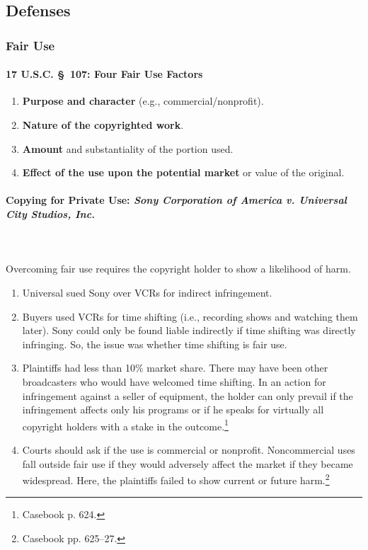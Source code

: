 \subsection{Defenses}

\subsubsection{Fair Use}

\paragraph{17 U.S.C. \S\ 107: Four Fair Use Factors}

\begin{enumerate}
    \item \textbf{Purpose and character} (e.g., commercial/nonprofit).
    \item \textbf{Nature of the copyrighted work}.
    \item \textbf{Amount} and substantiality of the portion used.
    \item \textbf{Effect of the use upon the potential market} or value of the 
    original.
\end{enumerate}

\paragraph{Copying for Private Use: \emph{Sony Corporation of America v. 
Universal City Studios, Inc.}}
~\\\\
Overcoming fair use requires the copyright holder to show a likelihood of 
harm.

\begin{enumerate}
    \item Universal sued Sony over VCRs for indirect infringement.
    \item Buyers used VCRs for time shifting (i.e., recording shows and 
    watching them later). Sony could only be found liable indirectly if time 
    shifting was directly infringing. So, the issue was whether time shifting 
    is fair use.
    \item Plaintiffs had less than 10\% market share. There may have been 
    other broadcasters who would have welcomed time shifting. In an action for 
    infringement against a seller of equipment, the holder can only prevail if 
    the infringement affects only his programs or if he speaks for virtually 
    all copyright holders with a stake in the outcome.\footnote{Casebook p. 
    624.}
    \item Courts should ask if the use is commercial or nonprofit. 
    Noncommercial uses fall outside fair use if they would adversely affect 
    the market if they became widespread. Here, the plaintiffs failed to show 
    current or future harm.\footnote{Casebook pp. 625--27.}
\end{enumerate}

